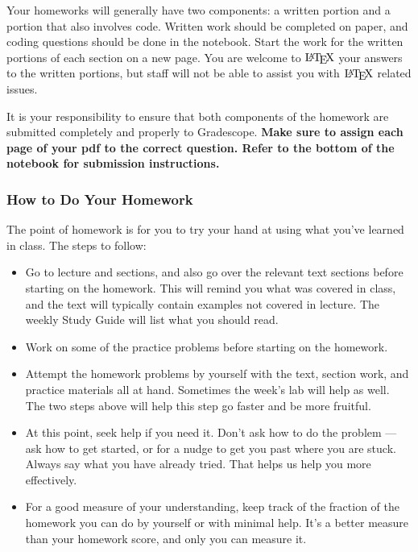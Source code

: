 \documentclass[11pt]{article}
\providecommand{\tightlist}{%
      \setlength{\itemsep}{0pt}\setlength{\parskip}{0pt}}
\let\Oldlatex\LaTeX
\renewcommand{\LaTeX}{\textrm{\Oldlatex}}
\begin{document}
Your homeworks will generally have two components: a written portion and
a portion that also involves code. Written work should be completed on
paper, and coding questions should be done in the notebook. Start the
work for the written portions of each section on a new page. You are
welcome to \(\LaTeX\) your answers to the written portions, but staff
will not be able to assist you with \(\LaTeX\) related issues.

It is your responsibility to ensure that both components of the homework
are submitted completely and properly to Gradescope. \textbf{Make sure
to assign each page of your pdf to the correct question. Refer to the
bottom of the notebook for submission instructions.}

    \hypertarget{how-to-do-your-homework}{%
\subsubsection{How to Do Your Homework}\label{how-to-do-your-homework}}

The point of homework is for you to try your hand at using what you've
learned in class. The steps to follow:

\begin{itemize}
\tightlist
\item
  Go to lecture and sections, and also go over the relevant text
  sections before starting on the homework. This will remind you what
  was covered in class, and the text will typically contain examples not
  covered in lecture. The weekly Study Guide will list what you should
  read.
\item
  Work on some of the practice problems before starting on the homework.
\item
  Attempt the homework problems by yourself with the text, section work,
  and practice materials all at hand. Sometimes the week's lab will help
  as well. The two steps above will help this step go faster and be more
  fruitful.
\item
  At this point, seek help if you need it. Don't ask how to do the
  problem --- ask how to get started, or for a nudge to get you past
  where you are stuck. Always say what you have already tried. That
  helps us help you more effectively.
\item
  For a good measure of your understanding, keep track of the fraction
  of the homework you can do by yourself or with minimal help. It's a
  better measure than your homework score, and only you can measure it.
\end{itemize}
\end{document}
